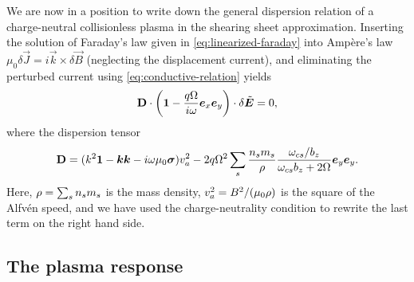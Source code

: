 \documentclass[aps,pre,notitlepage,amsmath,amssymb,amsfonts,nobibnotes,nofootinbib]{revtex4-1}
\begin{document}
We are now in a position to write down the general dispersion relation of a
charge-neutral collisionless plasma in the shearing sheet approximation.
Inserting the solution of Faraday's law given in \cref{eq:linearized-faraday}
into Ampère's law $\mu_0\delta\vec{J}=i\vec{k}\times\delta\vec{B}$ (neglecting
the displacement current), and eliminating the perturbed current using
\cref{eq:conductive-relation} yields
\begin{equation}
  \label{eq:dispersion-relation}
  \mathbf{D}\cdot\left(
    \mathbf{1} - \frac{q\Omega}{i\omega}\ex\ey
  \right)\cdot\delta\tvec{E} = 0,
\end{equation}
where the dispersion tensor
\begin{equation}
  \label{eq:dispersion-tensor}
  \mathbf{D} =
  (k^2\mathbf{1} - \vec{k}\vec{k} - i\omega\mu_0\vec{\sigma})\va^2
  - 2q\Omega^2\sums\frac{n_s m_s}{\rho}
  \frac{\omcs/b_z}{\omcs b_z + 2\Omega}\ey\ey.
\end{equation}
Here, $\rho=\sum_s{}n_s{}m_s$ is the mass density, $v_a^2=B^2/(\mu_0\rho)$ is
the square of the Alfvén speed, and we have used the charge-neutrality
condition to rewrite the last term on the right hand side.

\subsection{The plasma response}
\label{sec:plasma-response}
\end{document}
